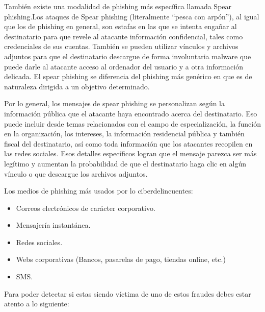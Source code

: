 \documentclass[
  spanish,
  a4paper,
  openany]{book}
\begin{document}
También existe una modalidad de phishing más específica llamada Spear phishing.Los ataques de Spear phishing (literalmente ``pesca con arpón''), al igual que los de phishing en general, son estafas en las que se intenta engañar al destinatario para que revele al atacante información confidencial, tales como credenciales de sus cuentas. También se pueden utilizar vínculos y archivos adjuntos para que el destinatario descargue de forma involuntaria malware que puede darle al atacante acceso al ordenador del usuario y a otra información delicada. El spear phishing se diferencia del phishing más genérico en que es de naturaleza dirigida a un objetivo determinado.

Por lo general, los mensajes de spear phishing se personalizan según la información pública que el atacante haya encontrado acerca del destinatario. Eso puede incluir desde temas relacionados con el campo de especialización, la función en la organización, los intereses, la información residencial pública y también fiscal del destinatario, así como toda información que los atacantes recopilen en las redes sociales. Esos detalles específicos logran que el mensaje parezca ser más legítimo y aumentan la probabilidad de que el destinatario haga clic en algún vínculo o que descargue los archivos adjuntos.\citep{PROOFPOINT-spear-phishing}

Los medios de phishing más usados por lo ciberdelincuentes:

\begin{itemize}
\item
  Correos electrónicos de carácter corporativo.
\item
  Mensajería instantánea.
\item
  Redes sociales.
\item
  Webs corporativas (Bancos, pasarelas de pago, tiendas online, etc.)
\item
  SMS.
\end{itemize}

Para poder detectar si estas siendo víctima de uno de estos fraudes debes estar atento a lo siguiente:
\end{document}
